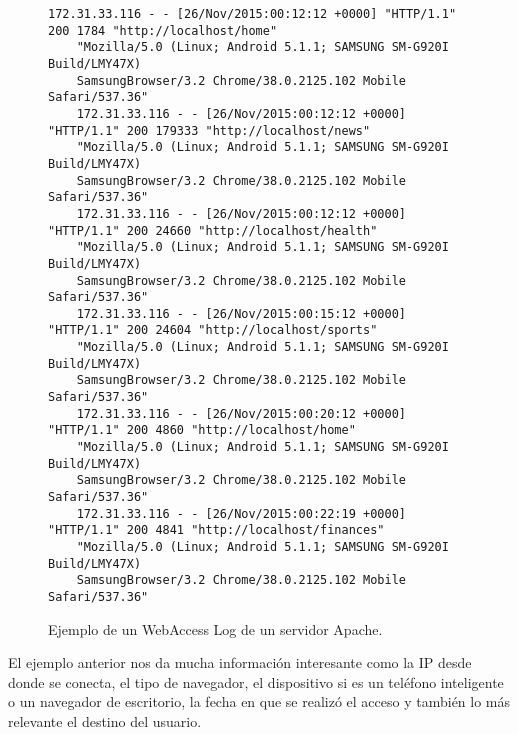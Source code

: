 \begin{figure}[t]%
	\centering
	
	\begin{lstlisting}[frame=single,basicstyle=\ttfamily\tiny,]
	172.31.33.116 - - [26/Nov/2015:00:12:12 +0000] "HTTP/1.1" 200 1784 "http://localhost/home" 
	"Mozilla/5.0 (Linux; Android 5.1.1; SAMSUNG SM-G920I Build/LMY47X) 
	SamsungBrowser/3.2 Chrome/38.0.2125.102 Mobile Safari/537.36"
	172.31.33.116 - - [26/Nov/2015:00:12:12 +0000] "HTTP/1.1" 200 179333 "http://localhost/news" 
	"Mozilla/5.0 (Linux; Android 5.1.1; SAMSUNG SM-G920I Build/LMY47X) 
	SamsungBrowser/3.2 Chrome/38.0.2125.102 Mobile Safari/537.36"
	172.31.33.116 - - [26/Nov/2015:00:12:12 +0000] "HTTP/1.1" 200 24660 "http://localhost/health" 
	"Mozilla/5.0 (Linux; Android 5.1.1; SAMSUNG SM-G920I Build/LMY47X) 
	SamsungBrowser/3.2 Chrome/38.0.2125.102 Mobile Safari/537.36"
	172.31.33.116 - - [26/Nov/2015:00:15:12 +0000] "HTTP/1.1" 200 24604 "http://localhost/sports" 
	"Mozilla/5.0 (Linux; Android 5.1.1; SAMSUNG SM-G920I Build/LMY47X) 
	SamsungBrowser/3.2 Chrome/38.0.2125.102 Mobile Safari/537.36"
	172.31.33.116 - - [26/Nov/2015:00:20:12 +0000] "HTTP/1.1" 200 4860 "http://localhost/home" 
	"Mozilla/5.0 (Linux; Android 5.1.1; SAMSUNG SM-G920I Build/LMY47X) 
	SamsungBrowser/3.2 Chrome/38.0.2125.102 Mobile Safari/537.36"
	172.31.33.116 - - [26/Nov/2015:00:22:19 +0000] "HTTP/1.1" 200 4841 "http://localhost/finances" 
	"Mozilla/5.0 (Linux; Android 5.1.1; SAMSUNG SM-G920I Build/LMY47X) 
	SamsungBrowser/3.2 Chrome/38.0.2125.102 Mobile Safari/537.36"
	\end{lstlisting}
	
	
	
	\caption{Ejemplo de un WebAccess Log de un servidor Apache.}
	\label{fig:sim}
\end{figure}







  El ejemplo anterior nos da mucha información interesante como la IP desde donde se conecta, el tipo de navegador, el dispositivo si es un teléfono inteligente o un navegador de escritorio, la fecha en que se realizó el acceso y también lo más relevante el destino del usuario.